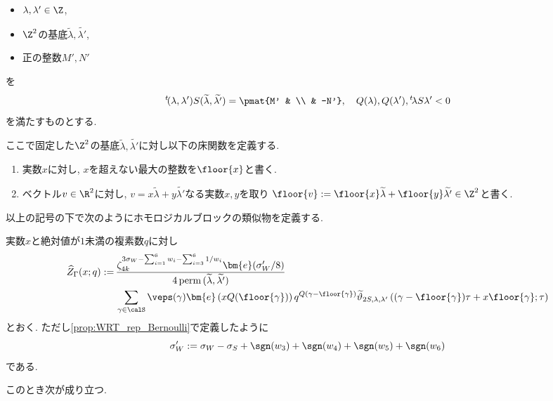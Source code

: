 \documentclass[11pt,b5paper,oneside,lualatex]{ltjsarticle} %
\DeclareMathOperator{\perm}{perm}
\numberwithin{equation}{section} %
\begin{document}
\begin{symb}
	\begin{itemize}
		\item $ \lambda, \lambda' \in \Z $,
		\item $ \Z^2 $の基底$ \widetilde{\lambda}, \widetilde{\lambda'} $,
		\item 正の整数$ M', N' $
	\end{itemize}
	を
	\[
	{}^t\!(\lambda, \lambda') S (\widetilde{\lambda}, \widetilde{\lambda'}) = \pmat{M' & \\ & -N'}, \quad
	Q(\lambda), Q(\lambda'), {}^t\!\lambda S \lambda' < 0
	\]
	を満たすものとする.
\end{symb}

ここで固定した$ \Z^2 $の基底$ \widetilde{\lambda}, \widetilde{\lambda'} $に対し以下の床関数を定義する. 

\begin{dfn}
	\begin{enumerate}
		\item 実数$ x $に対し, $ x $を超えない最大の整数を$ \floor{x} $と書く. 
		\item ベクトル$ v \in \R^2 $に対し, $ v = x \widetilde{\lambda} + y \widetilde{\lambda'} $なる実数$ x, y $を取り
		$ \floor{v} := \floor{x} \widetilde{\lambda} + \floor{y} \widetilde{\lambda'} \in \Z^2 $と書く. 
	\end{enumerate}
\end{dfn}

以上の記号の下で次のようにホモロジカルブロックの類似物を定義する. 

\begin{dfn} \label{dfn:HB}
	実数$ x $と絶対値が$ 1 $未満の複素数$ q $に対し
	\begin{align}
		\widehat{Z}_{\Gamma} (x; q)
		:= \,
		&\frac{
		\zeta_{4k}^{3\sigma_W - \sum_{i=1}^{6}w_{i} - \sum_{i=3}^{6} 1/w_{i}}
		\bm{e}(\sigma'_W/8)
		}
		{4 \perm{(\widetilde{\lambda}, \widetilde{\lambda'})}}
		\\
		&\sum_{\gamma \in \calS} 
		\veps(\gamma)
		\bm{e} \left( x Q(\floor{\gamma}) \right) q^{Q(\gamma - \floor{\gamma})}
		\widetilde{\vartheta}_{2S, \lambda, \lambda'} \left( (\gamma - \floor{\gamma})\tau + x \floor{\gamma}; \tau \right)
	\end{align}
	とおく. 
	ただし\cref{prop:WRT_rep_Bernoulli}で定義したように
	\[
	\sigma'_W
	:=
	\sigma_W  - \sigma_S + \sgn(w_3) + \sgn(w_4) +\sgn(w_5) + \sgn(w_6)
	\]
	である.
\end{dfn}

このとき次が成り立つ. 
\end{document}
